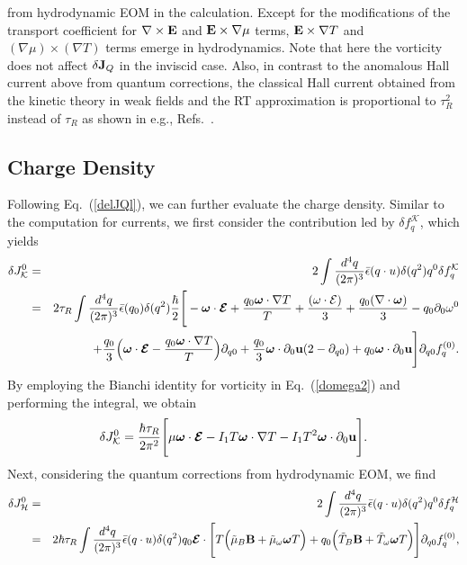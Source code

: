 \documentclass[aps,prd,showkeys,preprint,amsmath,amssymb,nofootinbib]{revtex4-1}
\begin{document}
from hydrodynamic EOM in the calculation. Except for the modifications of the transport coefficient for ${\bf\nabla\times E}$ and ${\bf E}\times\nabla\mu$ terms, ${\bf E}\times\nabla T$ and $(\nabla \mu)\times(\nabla T)$ terms emerge in hydrodynamics. Note that here the vorticity does not affect $\delta {\bf J}_Q$ in the inviscid case. Also, in contrast to the anomalous Hall current above from quantum corrections, the classical Hall current obtained from the kinetic theory in weak fields and the RT approximation is proportional to $\tau_R^2$ instead of $\tau_R$ as shown in e.g., Refs.~\cite{Pu:2014fva, Gorbar:2016qfh}.

\subsection{Charge Density} \label{charge density}
Following Eq.~(\ref{delJQl}), we can further evaluate the charge density. Similar to the computation for currents, we first consider the contribution led by $\delta f^{\mathcal{K}}_q$, which yields
\begin{eqnarray}\nonumber
\delta J_{\mathcal{K}}^0&=&2\int\frac{d^4q}{(2\pi)^3}\bar{\epsilon}(q\cdot u)\delta(q^2)q^{0}\delta f^{\mathcal{K}}_q
\\\nonumber
&=&2\tau_R\int\frac{d^4q}{(2\pi)^3}\bar{\epsilon}(q_0)\delta(q^2)
\frac{\hbar}{2}\Bigg[-\bm{\omega}\cdot\bm{\mathcal{E}}+\frac{q_0\bm{\omega}\cdot\nabla T}{T}
+\frac{(\omega\cdot \mathcal{E})}{3}
+\frac{q_0(\nabla\cdot\bm{\omega})}{3}-q_0\partial_0\omega^0
\\
&&+\frac{q_0}{3}\Big(\bm{\omega}\cdot\bm{\mathcal{E}}-\frac{q_0\bm{\omega}\cdot\nabla T}{T}\Big)\partial_{q0}
+\frac{q_0}{3}\bm{\omega}\cdot\partial_0{\bf u}(2-\partial_{q0})+q_0\bm{\omega}\cdot\partial_0{\bf u}
\Bigg]\partial_{q0}f^{(0)}_q.
\end{eqnarray}
By employing the Bianchi identity for vorticity in Eq.~(\ref{domega2}) and performing the integral, we obtain
\begin{eqnarray}
\delta J_{\mathcal{K}}^0
=\frac{\hbar\tau_R}{2\pi^2}\Bigg[ \mu\bm{\omega}\cdot\bm{\mathcal{E}}-I_1T\bm{\omega}\cdot\nabla T
-I_1T^2\bm{\omega}\cdot\partial_0{\bf u}
\Bigg].
\end{eqnarray}
Next, considering the quantum corrections from hydrodynamic EOM, we find
\begin{eqnarray}\nonumber
\delta J_{\mathcal{H}}^0&=&2\int\frac{d^4q}{(2\pi)^3}\bar{\epsilon}(q\cdot u)\delta(q^2)q^{0}\delta f^{\mathcal{H}}_q
\\
&=&2\hbar\tau_R\int\frac{d^4q}{(2\pi)^3}\bar{\epsilon}(q\cdot u)\delta(q^2)
q_0\bm{\mathcal{E}}\cdot\Bigg[ T\Big(\tilde{\mu}_B{\bf B}+\tilde{\mu}_{\omega}\bm{\omega}T\Big)+q_0\Big(\tilde{T}_B{\bf B}+\tilde{T}_{\omega}\bm{\omega}T\Big)\Bigg]\partial_{q0}f^{(0)}_q,
\end{eqnarray}
\end{document}
